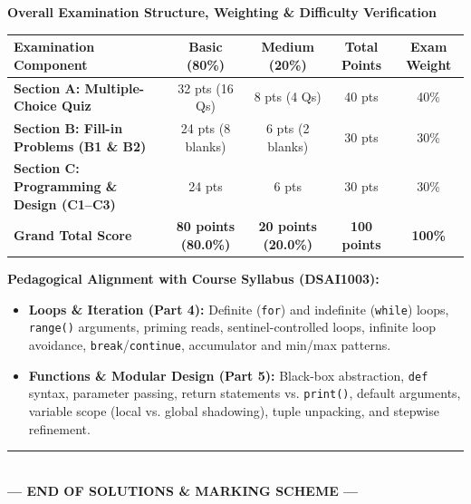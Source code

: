 \documentclass[11pt,a4paper]{article}
\begin{document}
\vspace{2mm}
\begin{tcolorbox}[colback=primaryblue!6, colframe=primaryblue, arc=1.5mm, boxrule=0.8pt, left=3.0mm, right=3.0mm, top=1.8mm, bottom=1.8mm]
\small
\textbf{\large Overall Examination Structure, Weighting \& Difficulty Verification}\\[1.5mm]
\renewcommand{\arraystretch}{1.15}
\begin{tabularx}{\linewidth}{|X|c|c|c||c|}
\hline
\textbf{Examination Component} & \textbf{Basic (80\%)} & \textbf{Medium (20\%)} & \textbf{Total Points} & \textbf{Exam Weight} \\
\hline
\textbf{Section A: Multiple-Choice Quiz} & 32 pts (16 Qs) & 8 pts (4 Qs) & 40 pts & 40\% \\
\hline
\textbf{Section B: Fill-in Problems (B1 \& B2)} & 24 pts (8 blanks) & 6 pts (2 blanks) & 30 pts & 30\% \\
\hline
\textbf{Section C: Programming \& Design (C1--C3)} & 24 pts & 6 pts & 30 pts & 30\% \\
\hline
\hline
\textbf{Grand Total Score} & \textbf{80 points (80.0\%)} & \textbf{20 points (20.0\%)} & \textbf{100 points} & \textbf{100\%} \\
\hline
\end{tabularx}

\vspace{1.5mm}
\textbf{Pedagogical Alignment with Course Syllabus (DSAI1003):}
\begin{itemize}[itemsep=0.2pt,topsep=0.2pt]
  \item \textbf{Loops \& Iteration (Part 4):} Definite (\texttt{for}) and indefinite (\texttt{while}) loops, \texttt{range()} arguments, priming reads, sentinel-controlled loops, infinite loop avoidance, \texttt{break}/\texttt{continue}, accumulator and min/max patterns.
  \item \textbf{Functions \& Modular Design (Part 5):} Black-box abstraction, \texttt{def} syntax, parameter passing, return statements vs. \texttt{print()}, default arguments, variable scope (local vs. global shadowing), tuple unpacking, and stepwise refinement.
\end{itemize}
\end{tcolorbox}

\vfill
\begin{center}
  \rule{0.5\textwidth}{0.4pt}\\[0.8mm]
  \textbf{\color{primaryblue}--- END OF SOLUTIONS \& MARKING SCHEME ---}
\end{center}
\end{document}
